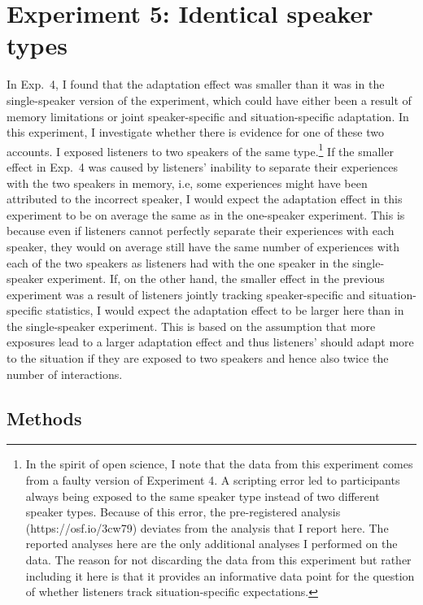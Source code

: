 \section{Experiment 5: Identical speaker types}

In Exp.~4, I found that the adaptation effect was smaller than it was in the single-speaker version of the experiment,
which could have either been a result of memory limitations or joint speaker-specific and situation-specific adaptation. 
In this experiment, I investigate
whether there is evidence for one of these two accounts. I 
exposed listeners to two speakers of the same type.\footnote{
In the spirit of open science, I note that the data from this 
experiment comes from a faulty version of Experiment 4. 
A scripting error led to  participants always being exposed to the 
same speaker type instead of two different speaker types. Because 
of this error, the pre-registered analysis (https://osf.io/3cw79) 
deviates from the analysis that I report here. The reported analyses 
here are the only additional analyses I performed on the data. The 
reason for not discarding the data from this experiment but rather including 
it here is that it provides  an informative data point for the question of whether
listeners track situation-specific expectations.
}
If the smaller effect in Exp.~4 was caused by listeners' inability to separate their experiences with the two speakers in memory, i.e, some experiences might have been attributed to the incorrect speaker, I would expect the adaptation effect in this experiment to be on average the same as in the one-speaker experiment. This is because even if listeners cannot perfectly separate their experiences with each speaker, they would on average still have the same number of experiences with each of the two speakers as listeners had with the one speaker in the single-speaker experiment. If, on the other hand, the smaller effect in the previous experiment was a result of listeners jointly tracking speaker-specific and situation-specific statistics, I would expect the adaptation effect to be larger here than in the single-speaker experiment. This is based on the assumption that more exposures lead to a larger adaptation effect and thus listeners' should adapt more to the situation if they are exposed to two speakers and hence also twice the number of interactions.

\subsection{Methods}

